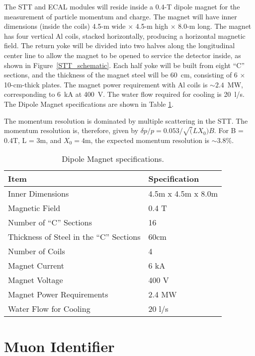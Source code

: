 \documentclass[aps,prl,preprint,groupedaddress]{revtex4}
\begin{document}
The STT and ECAL modules will reside inside a 0.4-T dipole 
magnet for the measurement of particle momentum and charge. 
The magnet will have inner dimensions (inside the coils) 
4.5-m wide $\times$ 4.5-m high $\times$ 8.0-m long. The 
magnet 
has four vertical Al coils, stacked horizontally, producing a horizontal magnetic 
field. The return yoke will be divided into two halves along the 
longitudinal center line to allow the magnet to be opened to service the
detector inside, as shown in Figure~\ref{STT_schematic}. 
Each half yoke will be built
from eight ``C'' sections, and the thickness of the 
magnet steel will be 60~cm, consisting of 6
$\times$ 10-cm-thick plates. The magnet power requirement with Al coils is $\sim 2.4$~MW,
corresponding to 6~kA at 400~V. The water flow required for cooling is 20~l/s.
The Dipole Magnet specifications are shown in Table \ref{Magnet_specs}.

The momentum resolution is dominated by multiple scattering in the STT. The momentum resolution is, therefore, given by 
$\delta p/p = 0.053/\sqrt(LX_0)B$. For B = 0.4T, L = 3m, and $X_0 = 4$m, the
expected momentum resolution is $\sim 3.8\%$. 

\begin{table}
\centering
  \caption{\label{Magnet_specs} Dipole Magnet specifications.}
  \begin{tabular}{| l | l |}
    \hline
Item&Specification \\
    \hline
Inner Dimensions & 4.5m x 4.5m x 8.0m \\
Magnetic Field & 0.4 T \\
Number of ``C'' Sections & 16 \\
Thickness of Steel in the ``C'' Sections & 60cm \\
Number of Coils & 4 \\
Magnet Current & 6 kA \\
Magnet Voltage & 400 V \\
Magnet Power Requirements & 2.4 MW \\
Water Flow for Cooling & 20 l/s \\
     \hline
  \end{tabular}
\end{table}

\section{Muon Identifier}
\label{sec:muid}
\end{document}
